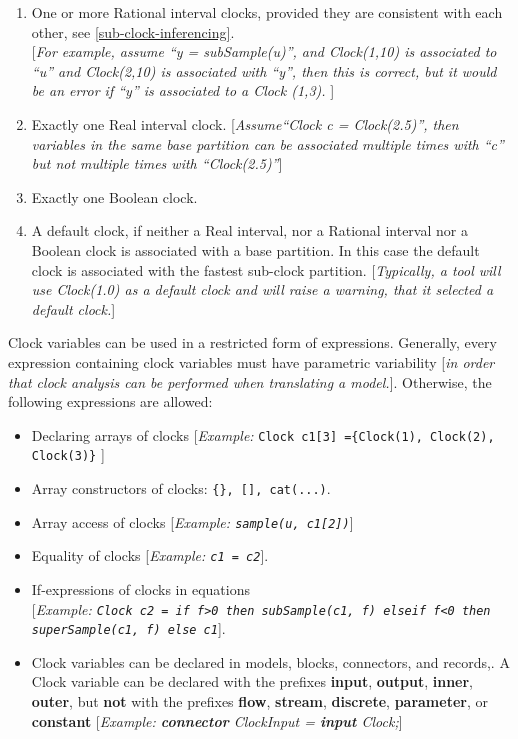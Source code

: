 \documentclass[10pt,a4paper]{report}
\renewcommand{\labelenumi}{\arabic{enumi}.}
\begin{document}
\begin{enumerate}
\def\labelenumi{\arabic{enumi}.}
\item
  One or more Rational interval clocks, provided they are consistent
  with each other, see \ref{sub-clock-inferencing}.\\
  {[}\emph{For example, assume ``y = subSample(u)'', and Clock(1,10) is
  associated to ``u'' and Clock(2,10) is associated with ``y'', then
  this is correct, but it would be an error if ``y'' is associated to a
  Clock (1,3).} {]}
\item
  Exactly one Real interval clock. {[}\emph{Assume``Clock c =
  Clock(2.5)'', then variables in the same base partition can be
  associated multiple times with ``c'' but not multiple times with
  ``Clock(2.5)''}{]}
\item
  Exactly one Boolean clock.
\item
  A default clock, if neither a Real interval, nor a Rational interval
  nor a Boolean clock is associated with a base partition. In this case
  the default clock is associated with the fastest sub-clock partition.
  {[}\emph{Typically, a tool will use Clock(1.0) as a default clock and
  will raise a warning, that it selected a default clock.}{]}
\end{enumerate}

Clock variables can be used in a restricted form of expressions.
Generally, every expression containing clock variables must have
parametric variability {[}\emph{in order that clock analysis can be
performed when translating a model.}{]}. Otherwise, the following
expressions are allowed:

\begin{itemize}
\item
  Declaring arrays of clocks {[}\emph{Example:} \lstinline!Clock c1[3] ={Clock(1), Clock(2), Clock(3)}! {]}
\item
  Array constructors of clocks: \lstinline!{}, [], cat(...)!.
\item
  Array access of clocks {[}\emph{Example:  \lstinline!sample(u, c1[2])!}{]}
\item
  Equality of clocks {[}\emph{Example: \lstinline!c1 = c2!}{]}.
\item
  If-expressions of clocks in equations\\
  {[}\emph{Example: \lstinline!Clock c2 = if f>0 then subSample(c1, f) elseif f<0 then superSample(c1, f) else c1!}{]}.
\item
  Clock variables can be declared in models, blocks, connectors, and
  records,. A Clock variable can be declared with the prefixes
  \textbf{input}, \textbf{output}, \textbf{inner}, \textbf{outer}, but
  \textbf{not} with the prefixes \textbf{flow}, \textbf{stream},
  \textbf{discrete}, \textbf{parameter}, or \textbf{constant}
  {[}\emph{Example: \textbf{connector} ClockInput = \textbf{input}
  Clock;}{]}
\end{itemize}
\end{document}
